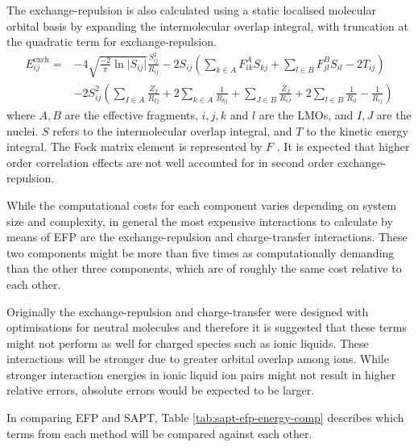 The exchange-repulsion is also calculated using a static localised molecular orbital basis by expanding the intermolecular overlap integral, with truncation at the quadratic term for exchange-repulsion.
\begin{equation}
   \begin{split}
    E^{\text{exch}}_{ij} = & -4 \sqrt{\frac{-2}{\pi} \ln \lvert S_{ij} \rvert } \frac{S^2_{ij}}{R_{ij}} 
                             -2 S_{ij} \left( \sum_{k \in A} F^A_{ik} S_{kj} + \sum_{l \in B} F^B_{jl}S_{il} - 2 T_{ij} \right) \\
                             &  -2 S^2_{ij} \left( \sum_{I \in A} \frac{Z_I}{R_{Ij}}  + 2 \sum_{k \in A} \frac{1}{R_{kj}} + 
                                 \sum_{J \in B} \frac{Z_J}{R_{iJ}} + 2 \sum_{l \in B} \frac{1}{R_{il}} - \frac{1}{R_{ij}} \right)
   \end{split}
\end{equation}
where $A,B$ are the effective fragments, $i, j, k$ and $l$ are the LMOs, and $I, J$ are the nuclei. 
$S$ refers to the intermolecular overlap integral, and $T$ to the kinetic energy integral.
The Fock matrix element is represented by $F$
\cite{Ghosh2010a}.
It is expected that higher order correlation effects are not well accounted for in second order exchange-repulsion.

While the computational costs for each component varies depending on system size and complexity, in general the most expensive interactions to calculate by means of EFP are the exchange-repulsion and charge-transfer interactions.
These two components might be more than five times as computationally demanding than the other three components, which are of roughly the same cost relative to each other.


Originally the exchange-repulsion and charge-transfer were designed with optimisations for neutral molecules and therefore it is suggested that these terms might not perform as well for charged species such as ionic liquids.
These interactions will be stronger due to greater orbital overlap among ions.
While stronger interaction energies in ionic liquid ion pairs might not result in higher relative errors, absolute errors would be expected to be larger.


In comparing EFP and SAPT, Table \ref{tab:sapt-efp-energy-comp} describes which terms from each method will be compared against each other.

